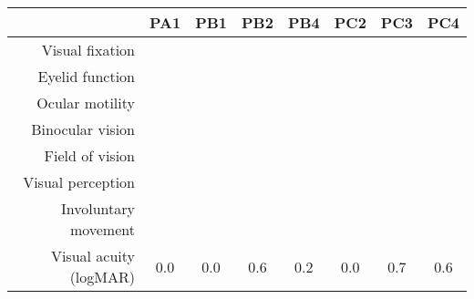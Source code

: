 \footnotesize
\let\oldarraystretch\arraystretch
\renewcommand{\arraystretch}{2}
\newcommand{\skill}{\cellcolor{lightgray}}
\newcommand{\noskill}{\cellcolor{accent1}\textcolor{muteblack}{\BigCross}}
\newcommand{\snoskill}{\cellcolor{accent2}\textcolor{muteblack}{\BigDiamondshape}}
\begin{tabular}{r|ccccccc}
                          & PA1      & PB1      & PB2       & PB4      & PC2       & PC3       & PC4 \\ \hline
  Visual fixation         & \noskill & \noskill & \noskill  & \noskill & \noskill  & \noskill  & \noskill \\
  Eyelid function         & \skill   & \skill   & \skill    & \skill   & \noskill  & \noskill  & \skill \\
  Ocular motility         & \skill   & \noskill & \skill    & \noskill & \snoskill & \snoskill & \noskill\\
  Binocular vision        & \skill   & \skill   & \skill    & \skill   & \noskill  & \snoskill & \snoskill \\
  Field of vision         & \skill   & \skill   & \skill    & \skill   & \skill    & \noskill  & \noskill \\
  Visual perception       & \skill   & \skill   & \skill    & \skill   & \skill    & \skill    & \skill\\
  Involuntary movement    & \skill   & \noskill & \noskill  & \noskill & \noskill  & \noskill  & \skill \\ \hline
  Visual acuity (logMAR)  & 0.0      & 0.0      & 0.6       & 0.2      & 0.0       & 0.7  & 0.6\\
\end{tabular}
